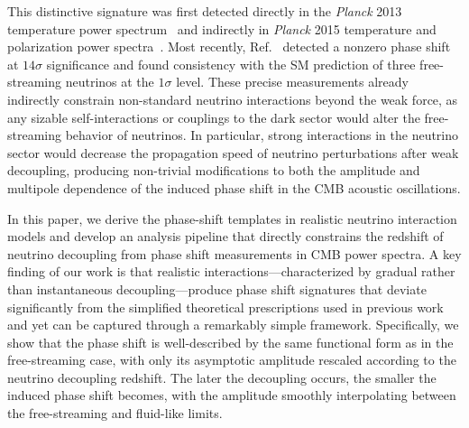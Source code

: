 \documentclass[aps,prd,twocolumn,showpacs,superscriptaddress,nofootinbib,preprintnumbers]{revtex4-2}
\begin{document}
This distinctive signature was first detected directly in the \textit{Planck} 2013 temperature power spectrum~\cite{Follin:2015hya} and indirectly in \textit{Planck} 2015 temperature and polarization power spectra~\cite{Baumann:2015rya}. Most recently, Ref.~\cite{Montefalcone:2025unv} detected a nonzero phase shift at $14\sigma$ significance and found consistency with the SM prediction of three free-streaming neutrinos at the $1\sigma$ level. These precise measurements already indirectly constrain non-standard neutrino interactions beyond the weak force, as any sizable self-interactions or couplings to the dark sector would alter the free-streaming behavior of neutrinos. In particular, strong interactions in the neutrino sector would decrease the propagation speed of neutrino perturbations after weak decoupling, producing non-trivial modifications to both the amplitude and multipole dependence of the induced phase shift in the CMB acoustic oscillations.

In this paper, we derive the phase-shift templates in realistic neutrino interaction models and develop an analysis pipeline that directly constrains the redshift of neutrino decoupling from phase shift measurements in CMB power spectra. A key finding of our work is that realistic interactions---characterized by gradual rather than instantaneous decoupling---produce phase shift signatures that deviate significantly from the simplified theoretical prescriptions used in previous work~\cite{Choi:2018gho,Loverde:2022wih} and yet can be captured through a remarkably simple framework. Specifically, we show that the phase shift is well-described by the same functional form as in the free-streaming case, with only its asymptotic amplitude rescaled according to the neutrino decoupling redshift. The later the decoupling occurs, the smaller the induced phase shift becomes, with the amplitude smoothly interpolating between the free-streaming and fluid-like limits.
\end{document}
